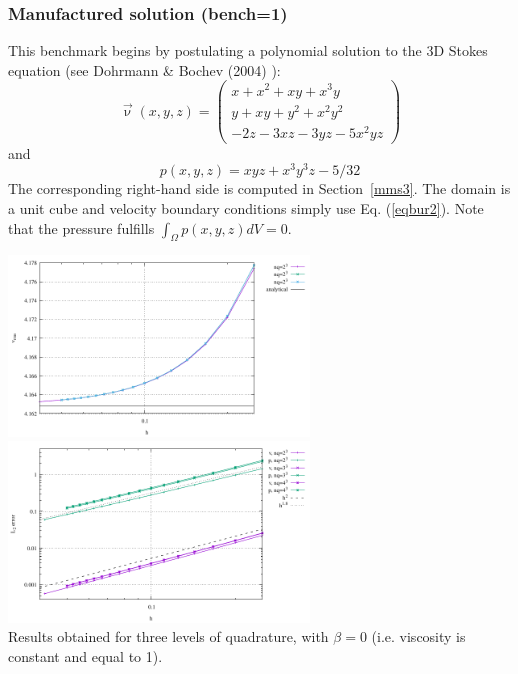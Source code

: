 


\subsubsection*{Manufactured solution (bench=1)}

This benchmark begins by postulating a polynomial solution 
to the 3D Stokes equation (see Dohrmann \& Bochev (2004) \cite{dobo04}):
\begin{equation}
\vec{\upnu}(x,y,z)
=
\left(
\begin{array}{c}
x+x^2+xy+x^3y \\
y + xy + y^2 + x^2 y^2\\
-2z - 3xz - 3yz - 5x^2 yz
\end{array}
\right)
\label{eqbur2}
\end{equation}
and
\begin{equation}
p(x,y,z) = xyz + x^3 y^3z - 5/32
\end{equation}
The corresponding right-hand side is computed in Section~\ref{mms3}.
The domain is a unit cube and velocity boundary conditions
simply use Eq. (\ref{eqbur2}).
Note that the pressure fulfills $\int_\Omega p(x,y,z) dV = 0.$

\begin{center}
\includegraphics[width=8cm]{python_codes/fieldstone_82/results/mms/vrms.pdf}
\includegraphics[width=8cm]{python_codes/fieldstone_82/results/mms/conv.pdf}\\
{\captionfont Results obtained for three levels of quadrature, with $\beta=0$ (i.e.
viscosity is constant and equal to 1).}
\end{center}

